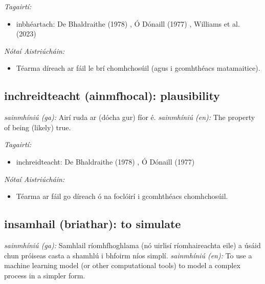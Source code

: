 \documentclass{article}
\begin{document}
 \noindent \textit{Tagairtí:}
\begin{itemize}
	\item inbhéartach: De Bhaldraithe (1978) \cite{de-bhaldraithe}, Ó Dónaill (1977) \cite{odonaill}, Williams et al. (2023) \cite{storchiste}
\end{itemize}

 \noindent \textit{Nótaí Aistriúcháin:}
\begin{itemize}
	\item Téarma díreach ar fáil le brí chomhchosúil (agus i gcomhthéacs matamaitice).
\end{itemize}


\subsection*{inchreidteacht (ainmfhocal): plausibility} 
 \noindent \textit{sainmhíniú (ga):} Airí ruda ar (dócha gur) fíor é.
\newline\newline
 \noindent \textit{sainmhíniú (en):} The property of being (likely) true.
\newline

 \noindent \textit{Tagairtí:}
\begin{itemize}
	\item inchreidteacht: De Bhaldraithe (1978) \cite{de-bhaldraithe}, Ó Dónaill (1977) \cite{odonaill}
\end{itemize}

 \noindent \textit{Nótaí Aistriúcháin:}
\begin{itemize}
	\item Téarma ar fáil go díreach ó na foclóirí i gcomhthéacs chomhchosúil.
\end{itemize}


\subsection*{insamhail (briathar): to simulate} 
 \noindent \textit{sainmhíniú (ga):} Samhlail ríomhfhoghlama (nó uirlisí ríomhaireachta eile) a úsáid chun próiseas casta a shamhlú i bhfoirm níos simplí.
\newline\newline
 \noindent \textit{sainmhíniú (en):} To use a machine learning model (or other computational tools) to model a complex process in a simpler form.
\newline
\end{document}
